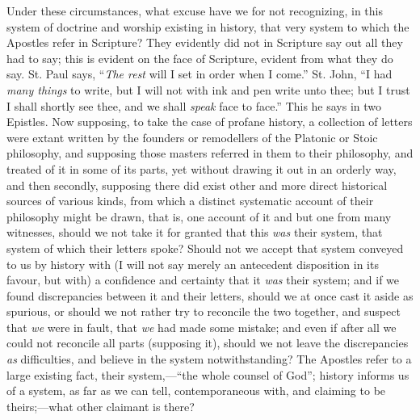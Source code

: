 Under these circumstances, what excuse have we for not recognizing,
in this system of doctrine and worship existing in history, that very
system to which the Apostles refer in Scripture? They evidently did
not in Scripture say out all they had to say; this is evident on the
face of Scripture, evident from what they do say. St. Paul says,
``\emph{The rest} will I set in order when I come.'' St. John,
``I had \emph{many things} to write, but I will not with ink and
pen write unto thee; but I trust I shall shortly see thee, and we
shall \emph{speak} face to face.'' This he says in two Epistles.
Now supposing, to take the case of profane history, a collection of
letters were extant written by the founders or remodellers of the
Platonic or Stoic philosophy, and supposing those masters referred in
them to their philosophy, and treated of it in some of its parts, yet
without drawing it out in an orderly way, and then secondly, supposing
there did exist other and more direct historical sources of various
kinds, from which a distinct systematic account of their
philosophy might be drawn, that is, one account of it and but one from
many witnesses, should we not take it for granted that this \emph{was} their
system, that system of which their letters spoke? Should not we accept
that system conveyed to us by history with (I will not say merely an
antecedent disposition in its favour, but with) a confidence and
certainty that it \emph{was} their system; and if we found
discrepancies between it and their letters, should we at once cast it
aside as spurious, or should we not rather try to reconcile the two
together, and suspect that \emph{we} were in fault, that \emph{we} had made some
mistake; and even if after all we could not reconcile all parts
(supposing it), should we not leave the discrepancies \emph{as}
difficulties, and believe in the system notwithstanding? The Apostles
refer to a large existing fact, their system,—``the whole
counsel of God''; history informs us of a system, as far as we can
tell, contemporaneous with, and claiming to be theirs;—what other
claimant is there?

